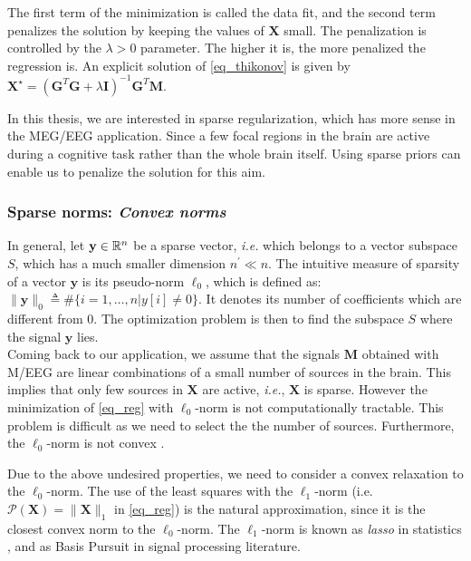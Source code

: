 The first term of the minimization is called the data fit, and the second term penalizes the solution by keeping the values of $\mathbf{X}$ small. The penalization is controlled by the $\lambda>0$ parameter. The higher it is, the more penalized the regression is. An explicit solution of \ref{eq_thikonov} is given by $\mathbf{X}^\star = (\mathbf{G}^T\mathbf{G}+\lambda\mathbf{I})^{-1}\mathbf{G}^T\mathbf{M}$. 

In this thesis, we are interested in sparse regularization, which has more sense in the MEG/EEG application. Since a few focal regions in the brain are active during a cognitive task rather than the whole brain itself. Using sparse priors can enable us to penalize the solution for this aim.

\subsubsection*{Sparse norms: \textit{Convex norms}}
In general, let $\mathbf{y}\in\mathbb{R}^n$ be a sparse vector, \textit{i.e.} which belongs to a vector subspace $S$, which has a much smaller dimension $n^\prime\ll n$. 
The intuitive measure of sparsity of a vector $\mathbf{y}$ is its pseudo-norm $\ell_0$, which is defined as: $\|\mathbf{y}\|_0\triangleq \#\{i=1,\dots ,n | y[i]\neq 0\}$. It denotes its number of coefficients which are different from 0. The optimization problem is then to find the subspace $S$ where the signal $\mathbf{y}$ lies.\\

Coming back to our application, we assume that the signals $\mathbf{M}$ obtained with M/EEG are linear combinations of a small number of sources in the brain. This implies that only few sources in $\mathbf{X}$ are active, \textit{i.e.}, $\mathbf{X}$ is sparse. However the minimization of \ref{eq_reg} with $\ell_0$-norm is not computationally tractable. This problem is difficult as we need to select the the number of sources. Furthermore, the $\ell_0$-norm is not convex \cite{natarajan1995sparse}.

Due to the above undesired properties, we need to consider a convex relaxation to the $\ell_0$-norm. The use of the least squares with the $\ell_1$-norm (i.e. $\mathcal{P}(\mathbf{X})=\|\mathbf{X}\|_1$ in \ref{eq_reg}) is the natural approximation, since it is the closest convex norm to the $\ell_0$-norm. The $\ell_1$-norm is known as \textit{lasso} in statistics \cite{tibshirani1996regression}, and as Basis Pursuit \cite{chen2001atomic} in signal processing literature.

